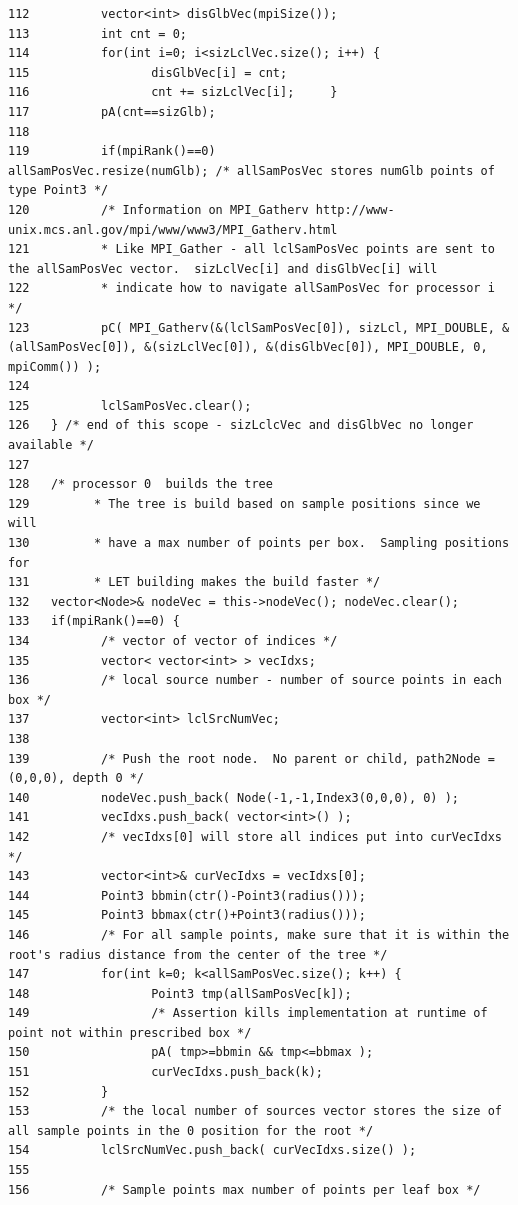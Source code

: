 \begin{verbatim}
112          vector<int> disGlbVec(mpiSize()); 
113          int cnt = 0;
114          for(int i=0; i<sizLclVec.size(); i++) {
115                 disGlbVec[i] = cnt;
116                 cnt += sizLclVec[i];     }
117          pA(cnt==sizGlb);
118          
119          if(mpiRank()==0)               allSamPosVec.resize(numGlb); /* allSamPosVec stores numGlb points of type Point3 */
120          /* Information on MPI_Gatherv http://www-unix.mcs.anl.gov/mpi/www/www3/MPI_Gatherv.html
121          * Like MPI_Gather - all lclSamPosVec points are sent to the allSamPosVec vector.  sizLclVec[i] and disGlbVec[i] will
122          * indicate how to navigate allSamPosVec for processor i */
123          pC( MPI_Gatherv(&(lclSamPosVec[0]), sizLcl, MPI_DOUBLE, &(allSamPosVec[0]), &(sizLclVec[0]), &(disGlbVec[0]), MPI_DOUBLE, 0, mpiComm()) );
124          
125          lclSamPosVec.clear();
126   } /* end of this scope - sizLclcVec and disGlbVec no longer available */
127   
128   /* processor 0  builds the tree 
129         * The tree is build based on sample positions since we will
130         * have a max number of points per box.  Sampling positions for
131         * LET building makes the build faster */
132   vector<Node>& nodeVec = this->nodeVec(); nodeVec.clear();
133   if(mpiRank()==0) {
134          /* vector of vector of indices */
135          vector< vector<int> > vecIdxs;
136          /* local source number - number of source points in each box */
137          vector<int> lclSrcNumVec;
138 
139          /* Push the root node.  No parent or child, path2Node = (0,0,0), depth 0 */
140          nodeVec.push_back( Node(-1,-1,Index3(0,0,0), 0) );
141          vecIdxs.push_back( vector<int>() );
142          /* vecIdxs[0] will store all indices put into curVecIdxs */
143          vector<int>& curVecIdxs = vecIdxs[0];
144          Point3 bbmin(ctr()-Point3(radius()));
145          Point3 bbmax(ctr()+Point3(radius()));
146          /* For all sample points, make sure that it is within the root's radius distance from the center of the tree */
147          for(int k=0; k<allSamPosVec.size(); k++) {
148                 Point3 tmp(allSamPosVec[k]);
149                 /* Assertion kills implementation at runtime of point not within prescribed box */
150                 pA( tmp>=bbmin && tmp<=bbmax );
151                 curVecIdxs.push_back(k);
152          }
153          /* the local number of sources vector stores the size of all sample points in the 0 position for the root */
154          lclSrcNumVec.push_back( curVecIdxs.size() );
155 
156          /* Sample points max number of points per leaf box */

\end{verbatim}
